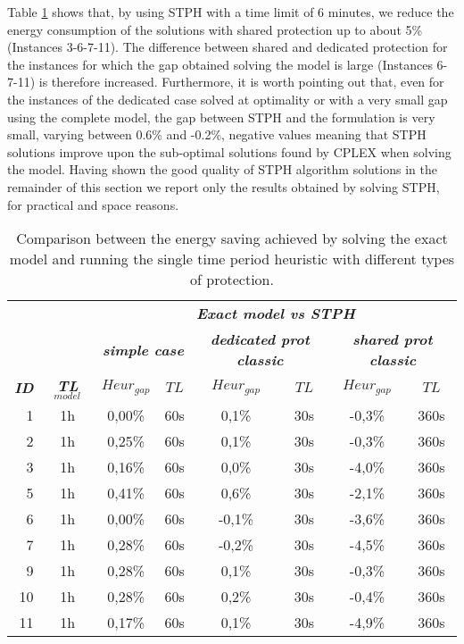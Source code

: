 \documentclass[final,5p,times,twocolumn]{elsarticle}
\begin{document}
Table \ref{tab:polska_model_vs_heur} shows that, by using STPH with a time limit of 6 minutes, we reduce the energy consumption of the solutions with shared protection up to about 5\% (Instances 3-6-7-11). The difference between shared and dedicated protection for the instances for which the gap obtained solving the model is large (Instances 6-7-11) is therefore increased. Furthermore, it is worth pointing out that, even for the instances of the dedicated case solved at optimality or with a very small gap using the complete model, the gap between STPH and the formulation is very small, varying between 0.6\% and -0.2\%, negative values meaning that STPH solutions improve upon the sub-optimal solutions found by CPLEX when solving the model. Having shown the good quality of STPH algorithm solutions in the remainder of this section we report only the results obtained by solving STPH,  for practical and space reasons.

\begin{table}[!htbp]
\centering
\scriptsize
\tabcolsep 3pt
\begin{tabular}{rccccccc}
& & \multicolumn{6}{c}{\textbf{\textit{Exact model vs STPH}}} \\
\cline{3-8}
& & \multicolumn{2}{c}{\textbf{\textit{simple case}}} & \multicolumn{2}{c}{\textbf{\textit{dedicated prot classic}}} & \multicolumn{2}{c}{\textbf{\textit{shared prot classic}}}  \\ 
\hline
\textbf{\textit{ID}} & \textbf{\textit{TL$_{model}$}} & \textbf{\textit{$Heur_{gap}$}} & \textbf{\textit{$TL$}} & \textbf{\textit{$Heur_{gap}$}} & \textbf{\textit{$TL$}} & \textbf{\textit{$Heur_{gap}$}} & \textbf{\textit{$TL$}} \\ 
\hline
1 & 1h & 0,00\% & 60s & 0,1\% & 30s & -0,3\% & 360s \\
2 & 1h & 0,25\% & 60s & 0,1\% & 30s & -0,3\% & 360s \\ 
3 & 1h & 0,16\% & 60s & 0,0\% & 30s & -4,0\% & 360s \\
5 & 1h & 0,41\% & 60s & 0,6\% & 30s & -2,1\% & 360s \\
6 & 1h & 0,00\% & 60s &-0,1\% & 30s & -3,6\% & 360s \\
7 & 1h & 0,28\% & 60s &-0,2\% & 30s & -4,5\% & 360s \\
9 & 1h & 0,28\% & 60s & 0,1\% & 30s & -0,3\% & 360s \\
10& 1h & 0,28\% & 60s & 0,2\% & 30s & -0,4\% & 360s \\
11& 1h & 0,17\% & 60s & 0,1\% & 30s & -4,9\% & 360s \\
\end{tabular}
\caption{Comparison between the energy saving achieved by solving the exact model and running the single time period heuristic with different types of protection.}
\label{tab:polska_model_vs_heur}
\end{table}
\end{document}
